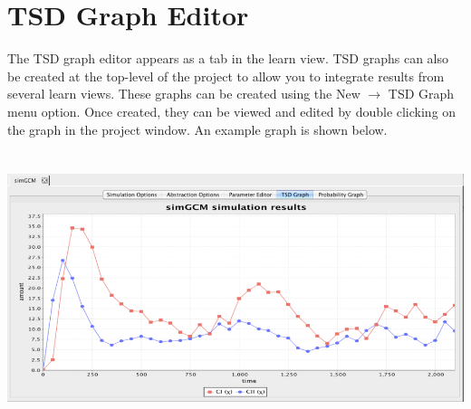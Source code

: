 \documentclass[titlepage,11pt]{article}
\begin{document}
\section{\label{TSDEdit}TSD Graph Editor}

\noindent
The TSD graph editor appears as a tab in the learn
view.  TSD graphs can also be created at the top-level of the project
to allow you to integrate results from several learn
views. These graphs can be created using the New $\rightarrow$ TSD Graph
menu option. Once created, they can be viewed and edited by double
clicking on the graph in the project window.  An example graph is
shown below.
\begin{center}
\includegraphics[height=80mm]{screenshots/TSDgraph}
\end{center}
\end{document}
